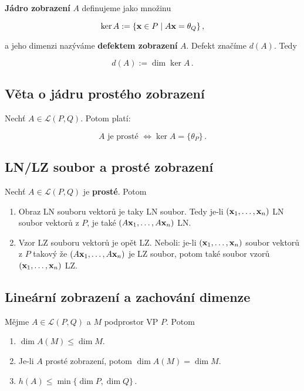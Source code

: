 \noindent \textbf{Jádro zobrazení} $A$ definujeme jako množinu

\[ \ker A:=\{\mathbf{x}\in P\mid A\mathbf{x}=\theta_Q\}\,, \]

\noindent a jeho dimenzi nazýváme \textbf{defektem zobrazení} $A$. Defekt značíme $d(A)$. Tedy

\[ d(A):=\dim \ker A\,. \]

\subsection*{Věta o jádru prostého zobrazení}

Nechť $A\in\mathcal L(P,Q)$. Potom platí:

\[ A\text{ je prosté }\Leftrightarrow \ker A=\{\theta_P\}\,. \]

\subsection*{LN/LZ soubor a prosté zobrazení}

Nechť $A\in\mathcal L(P,Q)$ je \textbf{prosté}. Potom

\begin{enumerate}
    \item Obraz LN souboru vektorů je taky LN soubor. Tedy je-li $(\mathbf{x}_1,\dots,\mathbf{x}_n)$ LN
          soubor vektorů z $P$, je také $(A\mathbf{x}_1,\dots,A\mathbf{x}_n)$ LN.
    \item Vzor LZ souboru vektorů je opět LZ. Neboli: je-li $(\mathbf{x}_1,\dots,\mathbf{x}_n)$ soubor
          vektorů z $P$ takový že $(A\mathbf{x}_1,\dots,A\mathbf{x}_n)$ je LZ soubor, potom také soubor
          vzorů $(\mathbf{x}_1,\dots,\mathbf{x}_n)$ LZ.
\end{enumerate}

\subsection*{Lineární zobrazení a zachování dimenze}

Mějme $A\in \mathcal L(P,Q)$ a $M$ podprostor VP $P$. Potom

\begin{enumerate}
    \item $\dim A(M) \leq \dim M$.
    \item Je-li $A$ prosté zobrazení, potom $\dim A(M) = \dim M$.
    \item $h(A)\leq \min \{\dim P, \dim Q\}\,.$
\end{enumerate}

\pagebreak
